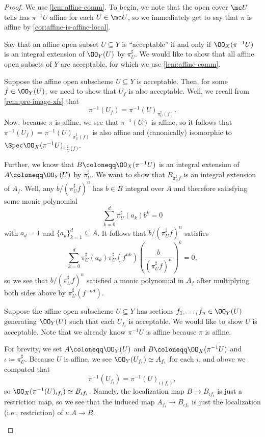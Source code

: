 \documentclass[../notes.tex]{subfiles}
\begin{document}
\begin{proof}
	We use \autoref{lem:affine-comm}. To begin, we note that the open cover $\mc U$ tells has $\pi^{-1}U$ affine for each $U\in\mc U$, so we immediately get to say that $\pi$ is affine by \autoref{cor:affine-is-affine-local}.
	
	Say that an affine open subset $U\subseteq Y$ is ``acceptable'' if and only if $\OO_X(\pi^{-1}U)$ is an integral extension of $\OO_Y(U)$ by $\pi^\sharp_U$. We would like to show that all affine open subsets of $Y$ are acceptable, for which we use \autoref{lem:affine-comm}.
	\begin{listroman}
		\item Suppose the affine open subscheme $U\subseteq Y$ is acceptable. Then, for some $f\in\OO_Y(U)$, we need to show that $U_f$ is also acceptable. Well, we recall from \autoref{rem:pre-image-xfs} that
		\[\pi^{-1}(U_f)=\pi^{-1}(U)_{\pi^\sharp_U(f)}.\]
		Now, because $\pi$ is affine, we see that $\pi^{-1}(U)$ is affine, so it follows that $\pi^{-1}(U_f)=\pi^{-1}(U)_{\pi^\sharp_U(f)}$ is also affine and (canonically) isomorphic to $\Spec\OO_X(\pi^{-1}U)_{\pi^\sharp_U(f)}$.
		
		Further, we know that $B\coloneqq\OO_X(\pi^{-1}U)$ is an integral extension of $A\coloneqq\OO_Y(U)$ by $\pi^\sharp_U$. We want to show that $B_{\pi^\sharp_Uf}$ is an integral extension of $A_f$. Well, any $b/(\pi^\sharp_Uf)^n$ has $b\in B$ integral over $A$ and therefore satisfying some monic polynomial
		\[\sum_{k=0}^d\pi^\sharp_U(a_k)b^k=0\]
		with $a_d=1$ and $\{a_k\}_{k=1}^d\subseteq A$. It follows that $b/(\pi^\sharp_Uf)^n$ satisfies
		\[\sum_{k=0}^d\pi^\sharp_U(a_k)\pi^\sharp_U(f^{nk})\left(\frac b{(\pi^\sharp_Uf)^n}\right)^k=0,\]
		so we see that $b/(\pi^\sharp_Uf)^n$ satisfied a monic polynomial in $A_f$ after multiplying both sides above by $\pi^\sharp_U(f^{-nd})$.
		\item Suppose the affine open subscheme $U\subseteq Y$ has sections $f_1,\ldots,f_n\in\OO_Y(U)$ generating $\OO_Y(U)$ such that each $U_{f_i}$ is acceptable. We would like to show $U$ is acceptable. Note that we already know $\pi^{-1}U$ is affine because $\pi$ is affine.

		For brevity, we set $A\coloneqq\OO_Y(U)$ and $B\coloneqq\OO_X(\pi^{-1}U)$ and $\iota\coloneqq\pi^\sharp_U$. Because $U$ is affine, we see $\OO_Y(U_{f_i})\simeq A_{f_i}$ for each $i$, and above we computed that
		\[\pi^{-1}(U_{f_i})=\pi^{-1}(U)_{\iota(f_i)},\]
		so $\OO_X(\pi^{-1}(U)_{\iota f_i})\simeq B_{\iota f_i}$. Namely, the localization map $B\to B_{\iota f_i}$ is just a restriction map, so we see that the induced map $A_{f_i}\to B_{\iota f_i}$ is just the localization (i.e., restriction) of $\iota\colon A\to B$.


\end{listroman}
\end{proof}
\end{document}
